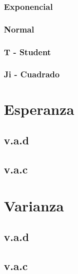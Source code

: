 \documentclass[
]{book}
\theoremstyle{definition}
\theoremstyle{definition}
\theoremstyle{definition}
\theoremstyle{definition}
\theoremstyle{remark}
\begin{document}
\hypertarget{exponencial}{%
\subsubsection*{Exponencial}\label{exponencial}}

\hypertarget{normal}{%
\subsubsection*{Normal}\label{normal}}

\hypertarget{t---student}{%
\subsubsection*{T - Student}\label{t---student}}

\hypertarget{ji---cuadrado}{%
\subsubsection*{Ji - Cuadrado}\label{ji---cuadrado}}

\hypertarget{esperanza}{%
\section{Esperanza}\label{esperanza}}

\hypertarget{v.a.d}{%
\subsection{v.a.d}\label{v.a.d}}

\hypertarget{v.a.c}{%
\subsection{v.a.c}\label{v.a.c}}

\hypertarget{varianza}{%
\section{Varianza}\label{varianza}}

\hypertarget{v.a.d-1}{%
\subsection{v.a.d}\label{v.a.d-1}}

\hypertarget{v.a.c-1}{%
\subsection{v.a.c}\label{v.a.c-1}}
\end{document}
